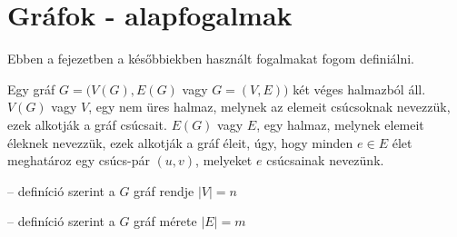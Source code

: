 \chapter{Gráfok - alapfogalmak}\label{ch:ALAP}

\begin{osszefoglal}
	Ebben a fejezetben a későbbiekben használt fogalmakat fogom definiálni.
	
\end{osszefoglal}

Egy gráf \(G = (V(G),E(G)\) vagy \(G = (V,E))\) két véges halmazból áll. \(V(G)\) vagy \(V\), egy nem üres halmaz, melynek az elemeit csúcsoknak nevezzük, ezek alkotják a gráf csúcsait. \(E(G)\) vagy \(E\), egy halmaz, melynek elemeit éleknek nevezzük, ezek alkotják a gráf éleit, úgy, hogy minden \(e \in E\) élet meghatároz egy csúcs-pár \((u,v)\), melyeket \(e\) csúcsainak nevezünk.

\begin{description}
	\setlength{\itemsep}{0.04mm}
	\item[rend] -- definíció szerint a \(G\) gráf rendje \(|V| = n\)
	\item[méret] -- definíció szerint a \(G\) gráf mérete \(|E| = m\)
\end{description}

